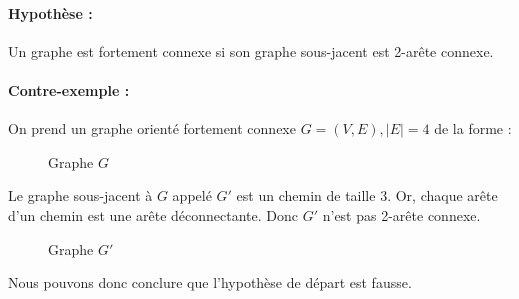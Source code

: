 \documentclass[11pt, a4paper]{article}
\begin{document}
\paragraph{Hypothèse :}Un graphe est fortement connexe si son graphe sous-jacent est 2-arête connexe. 

\paragraph{Contre-exemple :} On prend un graphe orienté fortement connexe $G = (V, E), |E| = 4$ de la forme : 
\begin{figure}[h]
\centering


\caption{Graphe $G$}
\end{figure}

Le graphe sous-jacent à $G$ appelé $G'$ est un chemin de taille 3. Or, chaque arête d'un chemin est une arête déconnectante. Donc $G'$ n'est pas 2-arête connexe.

\begin{figure}[h]
\centering
{}

\caption{Graphe $G'$}
\end{figure}

Nous pouvons donc conclure que l'hypothèse de départ est fausse.
\end{document}
